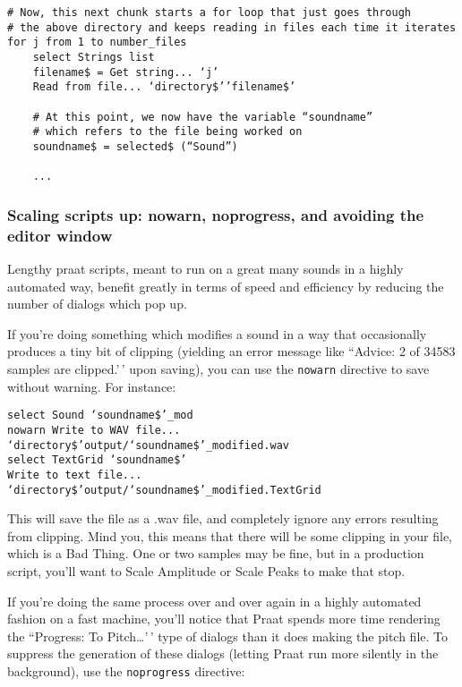 \begin{verbatim} 
# Now, this next chunk starts a for loop that just goes through 
# the above directory and keeps reading in files each time it iterates
for j from 1 to number_files
    select Strings list
    filename$ = Get string... ‘j’
    Read from file... ‘directory$’’filename$’
    
    # At this point, we now have the variable “soundname” 
    # which refers to the file being worked on
    soundname$ = selected$ (“Sound”)
    
    ...
\end{verbatim}

\hypertarget{scaling-scripts-up-nowarn-noprogress-and-avoiding-the-editor-window}{%
\subsubsection{Scaling scripts up: nowarn, noprogress, and avoiding the
editor
window}\label{scaling-scripts-up-nowarn-noprogress-and-avoiding-the-editor-window}}

\label{scaling}

Lengthy praat scripts, meant to run on a great many sounds in a highly
automated way, benefit greatly in terms of speed and efficiency by
reducing the number of dialogs which pop up.

If you're doing something which modifies a sound in a way that
occasionally produces a tiny bit of clipping (yielding an error message
like ``Advice: 2 of 34583 samples are clipped.'\,' upon saving), you can
use the \texttt{nowarn} directive to save without warning. For instance:

\begin{verbatim} 
select Sound ‘soundname$’_mod
nowarn Write to WAV file... ‘directory$’output/‘soundname$’_modified.wav
select TextGrid ‘soundname$’
Write to text file... ‘directory$’output/‘soundname$’_modified.TextGrid
\end{verbatim}

This will save the file as a .wav file, and completely ignore any errors
resulting from clipping. Mind you, this means that there will be some
clipping in your file, which is a Bad Thing. One or two samples may be
fine, but in a production script, you'll want to Scale Amplitude or
Scale Peaks to make that stop.

If you're doing the same process over and over again in a highly
automated fashion on a fast machine, you'll notice that Praat spends
more time rendering the ``Progress: To Pitch\ldots'\,' type of dialogs
than it does making the pitch file. To suppress the generation of these
dialogs (letting Praat run more silently in the background), use the
\texttt{noprogress} directive:

